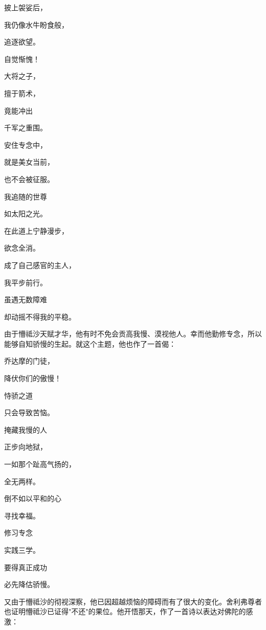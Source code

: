 \documentclass[12pt,twoside,openany]{book}
\newcommand{\kai}[1]{{\CJKfamily{kai}#1}}
\begin{document}
\kai {披上袈娑后，

我仍像水牛盼食般，

追逐欲望。

自觉惭愧！

大将之子，

擅于箭术，

竟能冲出

千军之重围。

安住专念中，

就是美女当前，

也不会被征服。

我追随的世尊

如太阳之光。

在此道上宁静漫步，

欲念全消。

成了自己感官的主人，

我平步前行。

虽遇无数障难

却动摇不得我的平稳。}

由于懵祗沙天赋才华，他有时不免会贡高我慢、漠视他人。幸而他勤修专念，所以能够自知骄慢的生起。就这个主题，他也作了一首偈：

\kai{乔达摩的门徒，

降伏你们的傲慢！

恃骄之道

只会导致苦恼。

掩藏我慢的人

正步向地狱，

一如那个趾高气扬的，

全无两样。

倒不如以平和的心

寻找幸福。

修习专念

实践三学。

要得真正成功

必先降估骄慢。}

又由于懵祗沙的彻视深察，他已因超越烦恼的障碍而有了很大的变化。舍利弗尊者也证明懵祗沙已证得"不还"的果位。他开悟那天，作了一首诗以表达对佛陀的感激：
\end{document}
